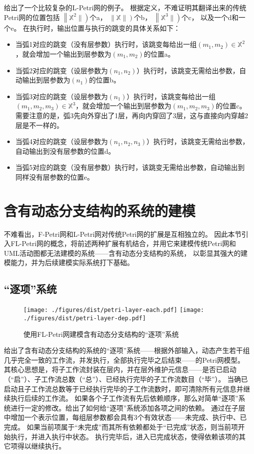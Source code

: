 \documentclass[index]{subfiles}
\begin{document}
给出了一个比较复杂的L-Petri网的例子。
根据定义，不难证明其翻译出来的传统Petri网的位置包括
$\left\|\mathbb{X}^{2}\|\right)$个a，
$\left\|\mathbb{X}\|\right)$个b，
$\left\|\mathbb{X}^{3}\|\right)$个c，
以及一个d和一个e。
在执行时，输出位置与执行的跳变的具体关系如下：
\begin{itemize}
  \item 当弧1对应的跳变（没有层参数）执行时，该跳变每给出一组$(m_1,m_2)\in\mathbb{X}^{2}$，就会增加一个输出到层参数为$(m_1,m_2)$的位置a。
  \item 当弧2对应的跳变（设层参数为$(n_1,n_2)$）执行时，该跳变无需给出参数，自动输出到层参数为$(n_1)$的位置b。
  \item 当弧3对应的跳变（设层参数为$(n_1)$）执行时，该跳变每给出一组$(m_1,m_2,m_3)\in\mathbb{X}^{3}$，就会增加一个输出到层参数为$(m_1,m_2,m_3)$的位置c。
    需要注意的是，弧3先向外穿出了1层，再向内穿回了3层，这与直接向内穿越2层是不一样的。
  \item 当弧4对应的跳变（设层参数为$(n_1,n_2,n_3)$）执行时，该跳变无需给出参数，自动输出到没有层参数的位置d。
  \item 当弧5对应的跳变（没有层参数）执行时，该跳变无需给出参数，自动输出到同样没有层参数的位置e。
\end{itemize}

\section{含有动态分支结构的系统的建模}
不难看出，F-Petri网和L-Petri网对传统Petri网的扩展是互相独立的。
因此本节引入FL-Petri网的概念，将前述两种扩展有机结合，并用它来建模传统Petri网和UML活动图都无法建模的系统——含有动态分支结构的系统，
以彰显其强大的建模能力，并为后续建模实际系统打下基础。

\subsection{“逐项”系统}
\begin{figure}[h]
  \centering%
    {\texttt{[image: ./figures/dist/petri-layer-each.pdf]}}
  \hspace{1em}
    {\texttt{[image: ./figures/dist/petri-layer-dep.pdf]}}
  \caption{使用FL-Petri网建模含有动态分支结构的“逐项”系统}
\end{figure}

给出了含有动态分支结构的系统的“逐项”系统——根据外部输入，动态产生若干组几乎完全一致的工作流，并发执行，全部执行完毕之后结束——的Petri网模型。
其核心思想是，将子工作流封装在层内，并在层外维护元信息——是否已启动（“启”）、子工作流总数（“总”）、已经执行完毕的子工作流数目（“毕”）。
当确已启动且子工作流总数等于已经执行完毕的子工作流数时，即可清除所有元信息并继续执行后续的工作流。
如果各个子工作流有先后依赖顺序，那么对简单“逐项”系统进行一定的修改。给出了如何给“逐项”系统添加各项之间的依赖。
通过在子层中增加一个表示位置，每组层参数都会具有3个有效状态——未完成、执行中、已完成。
如果当前项属于“未完成”而其所有依赖都处于“已完成”状态，则当前项开始执行，并进入执行中状态。
执行完毕后，进入已完成状态，使得依赖该项的其它项得以继续执行。
\end{document}
